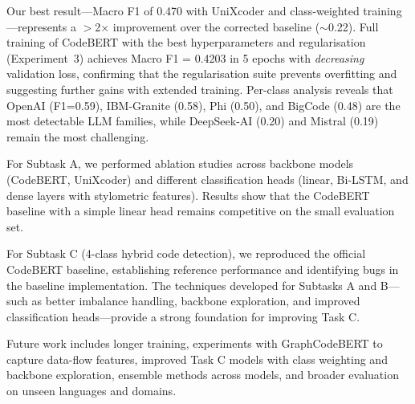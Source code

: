 \documentclass[11pt]{article}
\begin{document}
Our best result---Macro F1 of 0.470 with UniXcoder and class-weighted training---represents a $>$2$\times$ improvement over the corrected baseline ($\sim$0.22). Full training of CodeBERT with the best hyperparameters and regularisation (Experiment~3) achieves Macro F1 = 0.4203 in 5 epochs with \emph{decreasing} validation loss, confirming that the regularisation suite prevents overfitting and suggesting further gains with extended training. Per-class analysis reveals that OpenAI (F1=0.59), IBM-Granite (0.58), Phi (0.50), and BigCode (0.48) are the most detectable LLM families, while DeepSeek-AI (0.20) and Mistral (0.19) remain the most challenging.

For Subtask A, we performed ablation studies across backbone models (CodeBERT, UniXcoder) and different classification heads (linear, Bi-LSTM, and dense layers with stylometric features). Results show that the CodeBERT baseline with a simple linear head remains competitive on the small evaluation set.

For Subtask C (4-class hybrid code detection), we reproduced the official CodeBERT baseline, establishing reference performance and identifying bugs in the baseline implementation. The techniques developed for Subtasks A and B—such as better imbalance handling, backbone exploration, and improved classification heads—provide a strong foundation for improving Task C.

Future work includes longer training, experiments with GraphCodeBERT to capture data-flow features, improved Task C models with class weighting and backbone exploration, ensemble methods across models, and broader evaluation on unseen languages and domains.

\nocite{*}



%

\end{document}
